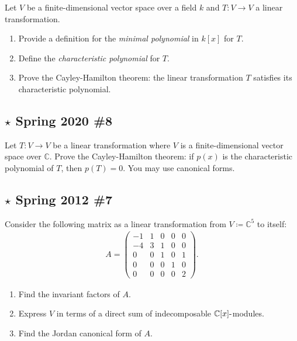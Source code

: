 Let \(V\) be a finite-dimensional vector space over a field \(k\) and
\(T:V\to V\) a linear transformation.

\begin{enumerate}
\def\labelenumi{\alph{enumi}.}
\item
  Provide a definition for the \emph{minimal polynomial} in \(k[x]\) for
  \(T\).
\item
  Define the \emph{characteristic polynomial} for \(T\).
\item
  Prove the Cayley-Hamilton theorem: the linear transformation \(T\)
  satisfies its characteristic polynomial.
\end{enumerate}

\hypertarget{star-spring-2020-8}{%
\subsection{\texorpdfstring{\(\star\) Spring 2020
\#8}{\textbackslash star Spring 2020 \#8}}\label{star-spring-2020-8}}

Let \(T:V\to V\) be a linear transformation where \(V\) is a
finite-dimensional vector space over \({\mathbb{C}}\). Prove the
Cayley-Hamilton theorem: if \(p(x)\) is the characteristic polynomial of
\(T\), then \(p(T) = 0\). You may use canonical forms.

\hypertarget{star-spring-2012-7}{%
\subsection{\texorpdfstring{\(\star\) Spring 2012
\#7}{\textbackslash star Spring 2012 \#7}}\label{star-spring-2012-7}}

Consider the following matrix as a linear transformation from
\(V\coloneqq{\mathbb{C}}^5\) to itself:
\begin{align*}
A=\left(\begin{array}{ccccc}
-1 & 1 & 0 & 0 & 0 \\
-4 & 3 & 1 & 0 & 0 \\
0 & 0 & 1 & 0 & 1 \\
0 & 0 & 0 & 1 & 0 \\
0 & 0 & 0 & 0 & 2
\end{array}\right)
.\end{align*}

\begin{enumerate}
\def\labelenumi{\alph{enumi}.}
\item
  Find the invariant factors of \(A\).
\item
  Express \(V\) in terms of a direct sum of indecomposable
  \({\mathbb{C}}[x]{\hbox{-}}\)modules.
\item
  Find the Jordan canonical form of \(A\).
\end{enumerate}

